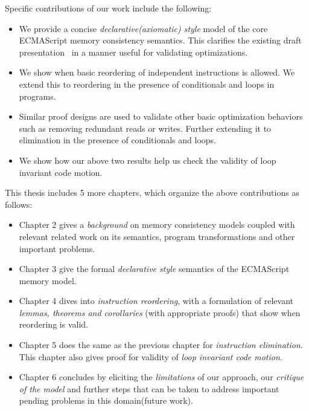 Specific contributions of our work include the following:
\begin{itemize}
    \item We provide a concise \textit{declarative(axiomatic) style} model of the core ECMAScript memory consistency semantics. This clarifies the existing draft presentation~\cite{ECMA} in a manner useful for validating optimizations.
    \item We show when basic reordering of independent instructions is allowed. We extend this to reordering in the presence of conditionals and loops in programs.
    \item Similar proof designs are used to validate other basic optimization behaviors such as removing redundant reads or writes. Further extending it to elimination in the presence of conditionals and loops. 
    \item We show how our above two results help us check the validity of loop invariant code motion. 
\end{itemize}

This thesis includes 5 more chapters, which organize the above contributions as follows:
\begin{itemize}
    \item Chapter 2 gives a \textit{background} on memory consistency models coupled with relevant related work on its semantics, program transformations and other important problems.
    \item Chapter 3 give the formal \textit{declarative style} semantics of the ECMAScript memory model.
    \item Chapter 4 dives into \textit{instruction reordering}, with a formulation of relevant \textit{lemmas, theorems and corollaries} (with appropriate proofs) that show when reordering is valid.
    \item Chapter 5 does the same as the previous chapter for \textit{instruction elimination}. This chapter also gives proof for validity of \textit{loop invariant code motion}. 
    \item Chapter 6 concludes by eliciting the \textit{limitations} of our approach, our \textit{critique of the model} and further steps that can be taken to address important pending problems in this domain(future work).
\end{itemize}